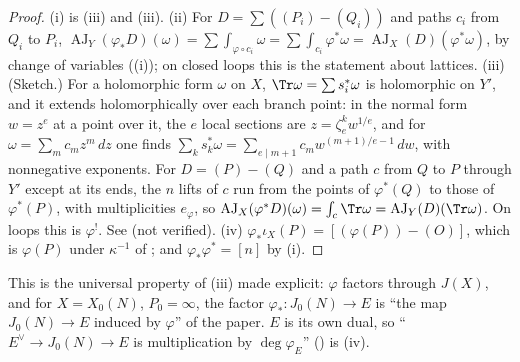 \begin{proof}
(i) is (iii) and (iii). (ii) For $D=\sum((P_i)-(Q_i))$ and paths $c_i$ from $Q_i$ to $P_i$,
$\operatorname{AJ}_Y(\varphi_*D)(\omega)=\sum\int_{\varphi\circ c_i}\omega=\sum\int_{c_i}\varphi^*\omega=\operatorname{AJ}_X(D)(\varphi^*\omega)$, by change of variables
((i)); on closed loops this is the statement about lattices. (iii) (Sketch.) For a holomorphic form $\omega$ on $X$, $\Tr\omega=\sum s_i^*\omega$ is
holomorphic on $Y'$, and it extends holomorphically over each branch point: in the normal form $w=z^e$ at a point over it, the $e$ local sections are
$z=\zeta_e^kw^{1/e}$, and for $\omega=\sum_mc_mz^m\,dz$ one finds $\sum_ks_k^*\omega=\sum_{e\mid m+1}c_mw^{(m+1)/e-1}\,dw$, with nonnegative exponents. For $D=(P)-(Q)$ and a path $c$
from $Q$ to $P$ through $Y'$ except at its ends, the $n$ lifts of $c$ run from the points of $\varphi^*(Q)$ to those of $\varphi^*(P)$, with multiplicities $e_\varphi$, so
$\operatorname{AJ}_X(\varphi^*D)(\omega)=\int_c\Tr\omega=\operatorname{AJ}_Y(D)(\Tr\omega)$. On loops this is $\varphi^!$. See \cite[Section 6]{MilneJacobian86} (not verified).
(iv) $\varphi_*\iota_X(P)=[(\varphi(P))-(O)]$, which is $\varphi(P)$ under $\kappa^{-1}$ of ; and $\varphi_*\varphi^*=[n]$ by (i).
\end{proof}

This is the universal property of (iii) made explicit: $\varphi$ factors through $J(X)$, and for $X=X_0(N)$, $P_0=\infty$, the factor
$\varphi_*\colon J_0(N)\to E$ is ``the map $J_0(N)\to E$ induced by $\varphi$'' of the paper. $E$ is its own dual, so ``$E^\vee\to J_0(N)\to E$ is multiplication by $\deg\varphi_E$''
() is (iv).


